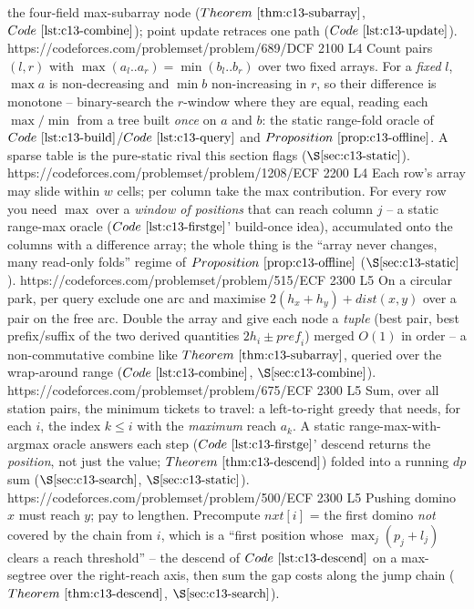 \begin{mixedset}
{     the four-field max-subarray node (\(\thmref{c13-subarray}\),
     \(\coderef{c13-combine}\)); point update retraces one path (\(\coderef{c13-update}\)).}
    {https://codeforces.com/problemset/problem/689/D}{CF 2100 L4}
    {Count pairs \((l,r)\) with \(\max(a_l..a_r)=\min(b_l..b_r)\) over two fixed
     arrays. For a \emph{fixed} \(l\), \(\max a\) is non-decreasing and \(\min b\)
     non-increasing in \(r\), so their difference is monotone -- binary-search the
     \(r\)-window where they are equal, reading each \(\max/\min\) from a tree
     built \emph{once} on \(a\) and \(b\): the static range-fold oracle of
     \(\coderef{c13-build}\)/\(\coderef{c13-query}\) and \(\propref{c13-offline}\).
     A sparse table is the pure-static rival this section flags (\(\secref{c13-static}\)).}
    {https://codeforces.com/problemset/problem/1208/E}{CF 2200 L4}
    {Each row's array may slide within \(w\) cells; per column take the max
     contribution. For every row you need \(\max\) over a \emph{window of positions}
     that can reach column \(j\) -- a static range-max oracle (\(\coderef{c13-firstge}\)'
     build-once idea), accumulated onto the columns with a difference array; the whole
     thing is the ``array never changes, many read-only folds'' regime of
     \(\propref{c13-offline}\) (\(\secref{c13-static}\)).}
    {https://codeforces.com/problemset/problem/515/E}{CF 2300 L5}
    {On a circular park, per query exclude one arc and maximise
     \(2(h_x+h_y)+\mathit{dist}(x,y)\) over a pair on the free arc. Double the array
     and give each node a \emph{tuple} (best pair, best prefix/suffix of the two
     derived quantities \(2h_i\pm\mathit{pref}_i\)) merged \(O(1)\) in order -- a
     non-commutative combine like \(\thmref{c13-subarray}\), queried over the
     wrap-around range (\(\coderef{c13-combine}\), \(\secref{c13-combine}\)).}
    {https://codeforces.com/problemset/problem/675/E}{CF 2300 L5}
    {Sum, over all station pairs, the minimum tickets to travel: a left-to-right
     greedy that needs, for each \(i\), the index \(k\le i\) with the \emph{maximum}
     reach \(a_k\). A static range-max-with-argmax oracle answers each step
     (\(\coderef{c13-firstge}\)' descend returns the \emph{position}, not just the
     value; \(\thmref{c13-descend}\)) folded into a running \(\mathit{dp}\) sum
     (\(\secref{c13-search}\), \(\secref{c13-static}\)).}
    {https://codeforces.com/problemset/problem/500/E}{CF 2300 L5}
    {Pushing domino \(x\) must reach \(y\); pay to lengthen. Precompute
     \(\mathit{nxt}[i]\) = the first domino \emph{not} covered by the chain from \(i\),
     which is a ``first position whose \(\max_j(p_j+l_j)\) clears a reach threshold''
     -- the descend of \(\coderef{c13-descend}\) on a max-segtree over the
     right-reach axis, then sum the gap costs along the jump chain
     (\(\thmref{c13-descend}\), \(\secref{c13-search}\)).}
\end{mixedset}



